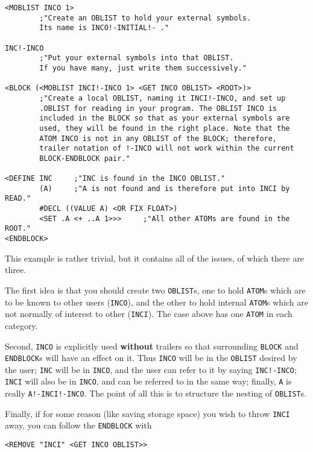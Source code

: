 \documentclass[a4paper]{scrbook}
\begin{document}
\begin{verbatim}
<MOBLIST INCO 1>
        ;"Create an OBLIST to hold your external symbols.
        Its name is INCO!-INITIAL!- ."

INC!-INCO
        ;"Put your external symbols into that OBLIST.
        If you have many, just write them successively."

<BLOCK (<MOBLIST INCI!-INCO 1> <GET INCO OBLIST> <ROOT>)>
        ;"Create a local OBLIST, naming it INCI!-INCO, and set up
        .OBLIST for reading in your program. The OBLIST INCO is
        included in the BLOCK so that as your external symbols are
        used, they will be found in the right place. Note that the
        ATOM INCO is not in any OBLIST of the BLOCK; therefore,
        trailer notation of !-INCO will not work within the current
        BLOCK-ENDBLOCK pair."

<DEFINE INC     ;"INC is found in the INCO OBLIST."
        (A)     ;"A is not found and is therefore put into INCI by READ."
        #DECL ((VALUE A) <OR FIX FLOAT>)
        <SET .A <+ ..A 1>>>     ;"All other ATOMs are found in the ROOT."
<ENDBLOCK>
\end{verbatim}

This example is rather trivial, but it contains all of the issues, of which there are three.

The first idea is that you should create two \texttt{OBLIST}s, one to hold \texttt{ATOM}s which are to be known to other
users (\texttt{INCO}), and the other to hold internal \texttt{ATOM}s which are not normally of interest to other
(\texttt{INCI}). The case above has one \texttt{ATOM} in each category.

Second, \texttt{INCO} is explicitly used \textbf{without} trailers so that surrounding \texttt{BLOCK} and
\texttt{ENDBLOCK}s will have an effect on it. Thus \texttt{INCO} will be in the \texttt{OBLIST} desired by the user;
\texttt{INC} will be in \texttt{INCO}, and the user can refer to it by saying \texttt{INC!-INCO}; \texttt{INCI} will also
be in \texttt{INCO}, and can be referred to in the same way; finally, \texttt{A} is really \texttt{A!-INCI!-INCO}. The
point of all this is to structure the nesting of \texttt{OBLIST}s.

Finally, if for some reason (like saving storage space) you wish to throw \texttt{INCI} away, you can follow the
\texttt{ENDBLOCK} with

\begin{verbatim}
<REMOVE "INCI" <GET INCO OBLIST>>
\end{verbatim}
\end{document}
